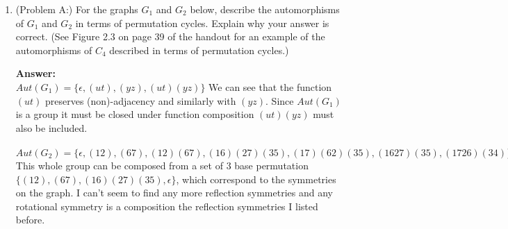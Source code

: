 \documentclass{amsart}
\newcommand{\vertex}{\node[vertex]}
\begin{document}
\thispagestyle{fancy}
 
\begin{enumerate}
\item (Problem A:) For the graphs $G_1$ and $G_2$ below, describe the automorphisms of $G_1$ and $G_2$ in terms of permutation cycles. Explain why your answer is correct. (See Figure 2.3 on page 39 of the handout for an example of the automorphisms of $C_4$ described in terms of permutation cycles.) \\

\begin{center}
\end{center}

\textbf{Answer:}\\
$Aut(G_1) = \{\epsilon, (ut),(yz),(ut)(yz)\}$ We can see that the function $(ut)$ preserves (non)-adjacency and similarly with $(yz)$. Since $Aut(G_1)$ is a group it must be closed under function composition $(ut)(yz)$ must also be included. \\\\
$Aut(G_2) = \{\epsilon, (12),(67),(12)(67), (16)(27)(35), (17)(62)(35), (1627)(35), (1726)(34)\}$ This whole group can be composed from a set of 3 base permutation $\{(12),(67),(16)(27)(35), \epsilon\}$, which correspond to the symmetries on the graph. I can't seem to find any more reflection symmetries and any rotational symmetry is a composition the reflection symmetries I listed before.   









\vspace{1.5in}


\end{enumerate}
\end{document}

